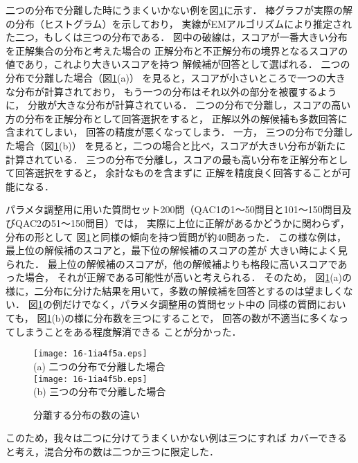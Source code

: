 \documentclass[japanese]{jnlp_1.4}
\begin{document}
二つの分布で分離した時にうまくいかない例を図\ref{fig:DistNum}に示す．
棒グラフが実際の解の分布（ヒストグラム）を示しており，
実線がEMアルゴリズムにより推定された二つ，もしくは三つの分布である．
図中の破線は，スコアが一番大きい分布を正解集合の分布と考えた場合の
正解分布と不正解分布の境界となるスコアの値であり，これより大きいスコアを持つ
解候補が回答として選ばれる．
二つの分布で分離した場合（図\ref{fig:DistNum}(a)）
を見ると，スコアが小さいところで一つの大きな分布が計算されており，
もう一つの分布はそれ以外の部分を被覆するように，
分散が大きな分布が計算されている．
二つの分布で分離し，スコアの高い方の分布を正解分布として回答選択をすると，
正解以外の解候補も多数回答に含まれてしまい，
回答の精度が悪くなってしまう．
一方，
三つの分布で分離した場合（図\ref{fig:DistNum}(b)）
を見ると，二つの場合と比べ，スコアが大きい分布が新たに
計算されている．
三つの分布で分離し，スコアの最も高い分布を正解分布として回答選択をすると，
余計なものを含まずに
正解を精度良く回答することが可能になる．

パラメタ調整用に用いた質問セット200問（QAC1の1〜50問目と101〜150問目及びQAC2の51〜150問目）では，
実際に上位に正解があるかどうかに関わらず，分布の形として
図\ref{fig:DistNum}と同様の傾向を持つ質問が約40問あった．
この様な例は，最上位の解候補のスコアと，最下位の解候補のスコアの差が
大きい時によく見られた．
最上位の解候補のスコアが，他の解候補よりも格段に高いスコアであった場合，
それが正解である可能性が高いと考えられる．
そのため，
図\ref{fig:DistNum}(a)の様に，二分布に分けた結果を用いて，多数の解候補を回答とするのは望ましくない．
図\ref{fig:DistNum}の例だけでなく，パラメタ調整用の質問セット中の
同様の質問においても，
図\ref{fig:DistNum}(b)の様に分布数を三つにすることで，
回答の数が不適当に多くなってしまうことをある程度解消できる
ことが分かった．

\begin{figure}[t]
\small
\begin{center}
\texttt{[image: 16-1ia4f5a.eps]}\\
  (a) 二つの分布で分離した場合 \\[1\baselineskip]
\texttt{[image: 16-1ia4f5b.eps]} \\
  (b) 三つの分布で分離した場合 \\
\end{center}
\caption{分離する分布の数の違い}
\label{fig:DistNum}
\end{figure}


このため，我々は二つに分けてうまくいかない例は三つにすれば
カバーできると考え，混合分布の数は二つか三つに限定した．
\end{document}
